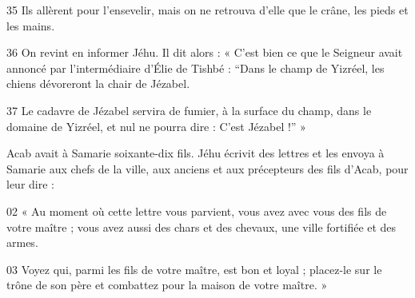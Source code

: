 
35 Ils allèrent pour l’ensevelir, mais on ne retrouva d’elle que le crâne, les pieds et les mains.

36 On revint en informer Jéhu. Il dit alors : « C’est bien ce que le Seigneur avait annoncé par l’intermédiaire d’Élie de Tishbé : “Dans le champ de Yizréel, les chiens dévoreront la chair de Jézabel.

37 Le cadavre de Jézabel servira de fumier, à la surface du champ, dans le domaine de Yizréel, et nul ne pourra dire : C’est Jézabel !” »

Acab avait à Samarie soixante-dix fils. Jéhu écrivit des lettres et les envoya à Samarie aux chefs de la ville, aux anciens et aux précepteurs des fils d’Acab, pour leur dire :

02 « Au moment où cette lettre vous parvient, vous avez avec vous des fils de votre maître ; vous avez aussi des chars et des chevaux, une ville fortifiée et des armes.

03 Voyez qui, parmi les fils de votre maître, est bon et loyal ; placez-le sur le trône de son père et combattez pour la maison de votre maître. »